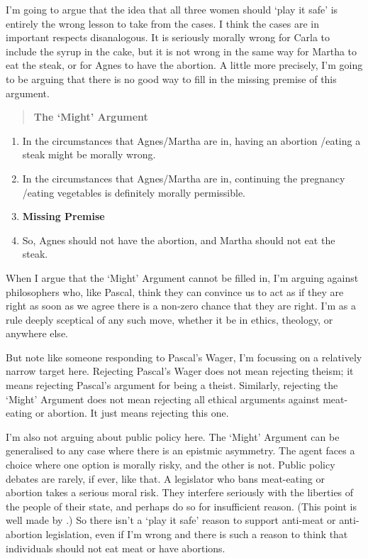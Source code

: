 I'm going to argue that the idea that all three women should `play it safe' is entirely the wrong lesson to take from the cases. I think the cases are in important respects disanalogous. It is seriously morally wrong for Carla to include the syrup in the cake, but it is not wrong in the same way for Martha to eat the steak, or for Agnes to have the abortion. A little more precisely, I'm going to be arguing that there is no good way to fill in the missing premise of this argument.

\begin{quote}

\textbf{The `Might' Argument}
\end{quote}
\begin{enumerate}
\item In the circumstances that Agnes\slash Martha are in, having an abortion \slash  eating a steak might be morally wrong.

\item In the circumstances that Agnes\slash Martha are in, continuing the pregnancy \slash  eating vegetables is definitely morally permissible.

\item \textbf{Missing Premise}

\item So, Agnes should not have the abortion, and Martha should not eat the steak.

\end{enumerate}
When I argue that the `Might' Argument cannot be filled in, I'm arguing against philosophers who, like Pascal, think they can convince us to act as if they are right as soon as we agree there is a non-zero chance that they are right. I'm as a rule deeply sceptical of any such move, whether it be in ethics, theology, or anywhere else.

But note like someone responding to Pascal's Wager, I'm focussing on a relatively narrow target here. Rejecting Pascal's Wager does not mean rejecting theism; it means rejecting Pascal's argument for being a theist. Similarly, rejecting the `Might' Argument does not mean rejecting all ethical arguments against meat-eating or abortion. It just means rejecting this one.

I'm also not arguing about public policy here. The `Might' Argument can be generalised to any case where there is an epistmic asymmetry. The agent faces a choice where one option is morally risky, and the other is not. Public policy debates are rarely, if ever, like that. A legislator who bans meat-eating or abortion takes a serious moral risk. They interfere seriously with the liberties of the people of their state, and perhaps do so for insufficient reason. (This point is well made by  \citet[442]{Moller2011}.) So there isn't a `play it safe' reason to support anti-meat or anti-abortion legislation, even if I'm wrong and there is such a reason to think that individuals should not eat meat or have abortions.

